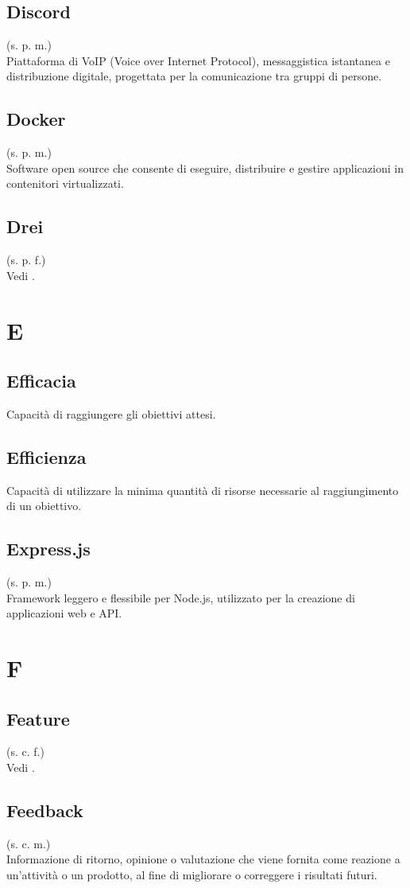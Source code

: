     \subsection{Discord}
    (s. p. m.)\\
    Piattaforma di VoIP (Voice over Internet Protocol), messaggistica istantanea 
    e distribuzione digitale, progettata per la comunicazione tra gruppi di persone.
    \subsection{Docker}
    (s. p. m.)\\
    Software open source che consente di eseguire, distribuire e gestire
    applicazioni in contenitori virtualizzati.
    \subsection{Drei}
    (s. p. f.)\\
    Vedi .
\pagebreak
\section{E}
    \subsection{Efficacia}
    Capacità di raggiungere gli obiettivi attesi.
    \subsection{Efficienza}
    Capacità di utilizzare la minima quantità di risorse necessarie al raggiungimento
    di un obiettivo.
    \subsection{Express.js}
    (s. p. m.)\\
    Framework leggero e flessibile per Node.js, utilizzato per la creazione di
    applicazioni web e API.
\pagebreak
\section{F}
    \subsection{Feature}
    (s. c. f.)\\
    Vedi .
    \subsection{Feedback}
    (s. c. m.)\\
    Informazione di ritorno, opinione o valutazione che viene fornita come reazione a 
    un'attività o un prodotto, al fine di migliorare o correggere i risultati futuri.
